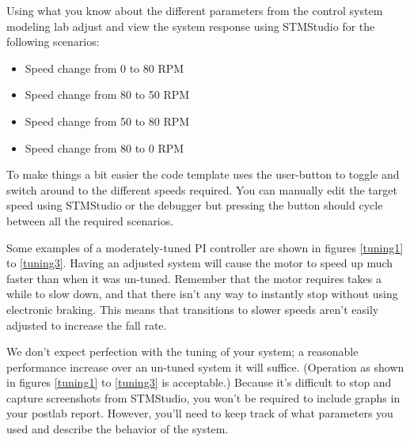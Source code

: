 \documentclass[openany,11pt,fleqn]{book} %
\begin{document}
\begin{exercise}Using what you know about the different parameters from the control system modeling lab adjust and view the system response using STMStudio for the following scenarios:

\begin{itemize}
    \item Speed change from 0 to 80 RPM
    \item Speed change from 80 to 50 RPM
    \item Speed change from 50 to 80 RPM
    \item Speed change from 80 to 0 RPM 
\end{itemize}
To make things a bit easier the code template uses the user-button to toggle and switch around to the different speeds required. You can manually edit the target speed using STMStudio or the debugger but pressing the button should cycle between all the required scenarios. 




Some examples of a moderately-tuned PI controller are shown in figures \ref{tuning1} to \ref{tuning3}. Having an adjusted system will cause the motor to speed up much faster than when it was un-tuned. Remember that the motor requires takes a while to slow down, and that there isn't any way to instantly stop without using electronic braking. This means that transitions to slower speeds aren't easily adjusted to increase the fall rate. 




We don't expect perfection with the tuning of your system; a reasonable performance increase over an un-tuned system it will suffice. (Operation as shown in figures \ref{tuning1} to \ref{tuning3} is acceptable.) Because it's difficult to stop and capture screenshots from STMStudio, you won't be required to include graphs in your postlab report. However, you'll need to keep track of what parameters you used and describe the behavior of the system. 

\end{exercise}
\end{document}
